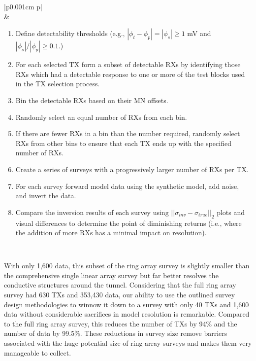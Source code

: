\documentclass[preprint,authoryear,12pt]{elsarticle}
\newcommand{\midtilde}{\raisebox{-0.25\baselineskip}{\textasciitilde}}
\begin{document}
\begin{table}
   \scriptsize
   \begin{tabular} {|p{0.001cm} p{\linewidth}|}
      \hline
       \\
       &
         \begin{enumerate}[leftmargin=*]
            \item Define detectability thresholds (e.g., $|\phi_t - \phi_p| = |\phi_s| \geq 1$ mV and  $|\phi_s|/|\phi_p| \geq 0.1$.)
            \item For each selected TX form a subset of detectable RXs by identifying those RXs which had a detectable response to one or more of the test blocks used in the TX selection process.
            \item Bin the detectable RXs based on their MN offsets.
            \item Randomly select an equal number of RXs from each bin.
            \item  If there are fewer RXs in a bin than the number required, randomly select RXs from other bins to ensure that each TX ends up with the specified number of RXs.
            \item Create a series of surveys with a progressively larger number of RXs per TX.
            \item For each survey forward model data using the synthetic model, add noise, and invert the data.
            \item Compare the inversion results of each survey using $\left|| \sigma_{inv} - \sigma_{true} \right||_2$ plots and visual differences to determine the point of diminishing returns (i.e.,  where the addition of more RXs has a minimal impact on resolution).
         \end{enumerate} \\
      \hline
   \end{tabular}
   \caption{Workflow summarizing the steps in the data-based RX selection methodology.}
   \label{table:RX_Selection_Methodology}
\end{table}


With only 1,600 data, this subset of the ring array survey is slightly smaller than the comprehensive single linear array survey but far better resolves the conductive structures around the tunnel. Considering that the full ring array survey had 630 TXs and 353,430 data, our ability to use the outlined survey design methodologies to winnow it down to a survey with only 40 TXs and 1,600 data without considerable sacrifices in model resolution is remarkable. Compared to the full ring array survey, this reduces the number of TXs by \midtilde94\% and the number of data by \midtilde99.5\%. These reductions in survey size remove barriers associated with the huge potential size of ring array surveys and makes them very manageable to collect.
\end{document}
